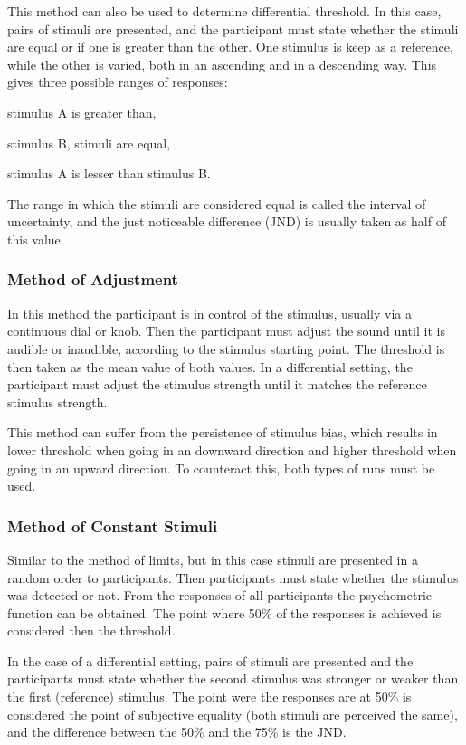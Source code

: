 This method can also be used to determine differential threshold. In this case,
pairs of stimuli are presented, and the participant must state whether the
stimuli are equal or if one is greater than the other. One stimulus is keep as a
reference, while the other is varied, both in an ascending and in a descending
way. This gives three possible ranges of responses:
\begin{inparaenum}[(i)]
    \item stimulus A is greater than,
    \item stimulus B, stimuli are equal,
    \item stimulus A is lesser than stimulus B.
\end{inparaenum}
The range in which the stimuli are considered equal is called the interval of
uncertainty, and the just noticeable difference (JND) is usually taken as half
of this value.

\subsubsection{Method of Adjustment}

In this method the participant is in control of the stimulus, usually via a
continuous dial or knob. Then the participant must adjust the sound until it is
audible or inaudible, according to the stimulus starting point. The threshold is
then taken as the mean value of both values. In a differential setting, the
participant must adjust the stimulus strength until it matches the reference
stimulus strength.

This method can suffer from the persistence of stimulus bias, which results in
lower threshold when going in an downward direction and higher threshold when
going in an upward direction. To counteract this, both types of runs must be
used.

\subsubsection{Method of Constant Stimuli}

Similar to the method of limits, but in this case stimuli are presented in a
random order to participants. Then participants must state whether the stimulus
was detected or not. From the responses of all participants the psychometric
function can be obtained. The point where 50\% of the responses is achieved is
considered then the threshold.

In the case of a differential setting, pairs of stimuli are presented and the
participants must state whether the second stimulus was stronger or weaker than
the first (reference) stimulus. The point were the responses are at 50\% is
considered the point of subjective equality (both stimuli are perceived the
same), and the difference between the 50\% and the 75\% is the JND.

